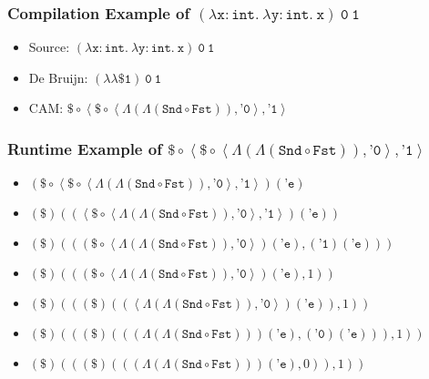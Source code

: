 \documentclass[aspectratio=169, draft]{beamer}
\begin{document}
\def\App{\mathtt{\$}}
\newcommand\Apply[2]{\left(#1\right)\left(#2\right)}
\newcommand\Compose[2]{#1\circ#2}
\newcommand\DPair[2]{\left(#1, #2\right)}
\def\Fst{\mathtt{Fst}}
\newcommand\Lam[1]{\Lambda\left(#1\right)}
\newcommand\Pair[2]{\left<#1, #2\right>}
\newcommand\Quote[1]{\texttt{'#1}}
\def\Snd{\mathtt{Snd}}

\begin{frame}
	\frametitle{Compilation Example of $\mathtt{\left(\lambda x:int.\ \lambda y:int.\ x\right)\ 0\ 1}$}
	\begin{itemize}[<+->]
		\item Source: $\mathtt{\left(\lambda x:int.\ \lambda y:int.\ x\right)\ 0\ 1}$
		\item De Bruijn: $\mathtt{\left(\lambda\lambda\$1\right)\ 0\ 1}$
		\item CAM: $\Compose{\App}{\Pair{\Compose{\App}{\Pair{\Lam{\Lam{\Compose{\Snd}{\Fst}}}}{\Quote{0}}}}{\Quote{1}}}$
	\end{itemize}
\end{frame}

\begin{frame}
	\frametitle{Runtime Example of $\Compose{\App}{\Pair{\Compose{\App}{\Pair{ \Lam{\Lam{\Compose{\Snd}{\Fst}}}}{\Quote{0}}}}{\Quote{1}}}$}
	\begin{itemize}[<+->]
		\item $\Apply{\Compose{\App}{\Pair{\Compose{\App}{\Pair{\Lam{\Lam{\Compose{\Snd}{\Fst}}}}{\Quote{0}}}}{\Quote{1}}}}{\Quote{e}}$
		\item $\Apply{\App}{\Apply{\Pair{\Compose{\App}{\Pair{\Lam{\Lam{\Compose{\Snd}{\Fst}}}}{\Quote{0}}}}{\Quote{1}}}{\Quote{e}}}$
		\item $\Apply{\App}{\DPair{
			\Apply{\Compose{\App}{\Pair{\Lam{\Lam{\Compose{\Snd}{\Fst}}}}{\Quote{0}}}}{\Quote{e}}
		}{\Apply{\Quote{1}}{\Quote{e}}}}$
		\item $\Apply{\App}{\DPair{
			\Apply{\Compose{\App}{\Pair{\Lam{\Lam{\Compose{\Snd}{\Fst}}}}{\Quote{0}}}}{\Quote{e}}
		}{1}}$
		\item $\Apply{\App}{\DPair{
			\Apply{\App}{\Apply{
				\Pair{\Lam{\Lam{\Compose{\Snd}{\Fst}}}
			}{
				\Quote{0}
			}}{\Quote{e}}}
		}{1}}$
		\item $\Apply{\App}{\DPair{
			\Apply{\App}{\DPair{
				\Apply{\Lam{\Lam{\Compose{\Snd}{\Fst}}}}{\Quote{e}}
			}{
				\Apply{\Quote{0}}{\Quote{e}}
			}}
		}{1}}$
		\item $\Apply{\App}{\DPair{
			\Apply{\App}{\DPair{
				\Apply{\Lam{\Lam{\Compose{\Snd}{\Fst}}}}{\Quote{e}}
			}{0}}
		}{1}}$
	\end{itemize}
\end{frame}
\end{document}
